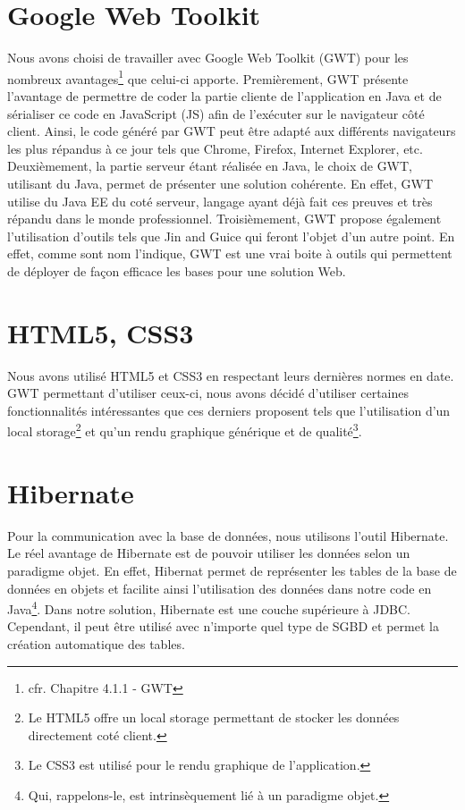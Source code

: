 \section{Google Web Toolkit}

Nous avons choisi de travailler avec Google Web Toolkit (GWT) pour les nombreux avantages\footnote{cfr. Chapitre 4.1.1 - GWT} que celui-ci apporte. 
\newline
\indent
Premièrement,  GWT présente l'avantage de permettre de coder la partie cliente de l'application en Java et de sérialiser ce code en JavaScript (JS) afin de l'exécuter sur le navigateur côté client. Ainsi, le code généré par GWT peut être adapté aux différents navigateurs les plus répandus à ce jour tels que Chrome, Firefox, Internet Explorer, etc.
\newline
\indent
Deuxièmement, la partie serveur étant réalisée en Java, le choix de GWT, utilisant du Java, permet de présenter une solution cohérente. En effet, GWT utilise du Java EE du coté serveur, langage ayant déjà fait ces preuves et très répandu dans le monde professionnel.
\newline
\indent
Troisièmement, GWT propose également l'utilisation d'outils tels que Jin and Guice qui feront l'objet d'un autre point. En effet, comme sont nom l'indique, GWT est une vrai boite à outils qui permettent de déployer de façon efficace les bases pour une solution Web.


\section{HTML5, CSS3}
Nous avons utilisé HTML5 et CSS3 en respectant leurs dernières normes en date. GWT permettant d'utiliser ceux-ci, nous avons décidé d'utiliser certaines fonctionnalités intéressantes que ces derniers proposent tels que l'utilisation d'un local storage\footnote{Le HTML5 offre un local storage permettant de stocker les données directement coté client.} et qu'un rendu graphique générique et de qualité\footnote{Le CSS3 est utilisé pour le rendu graphique de l'application.}.

\section{Hibernate}
Pour la communication avec la base de données, nous utilisons l'outil Hibernate. Le réel avantage de Hibernate est de pouvoir utiliser les données selon un paradigme objet. 
\newline
\indent
En effet, Hibernat permet de représenter les tables de la base de données en objets et facilite ainsi l'utilisation des données dans notre code en Java\footnote{Qui, rappelons-le, est intrinsèquement lié à un paradigme objet.}.
\newline
\indent
Dans notre solution, Hibernate est une couche supérieure à JDBC. Cependant, il peut être utilisé avec n'importe quel type de SGBD et permet la création automatique des tables. 

